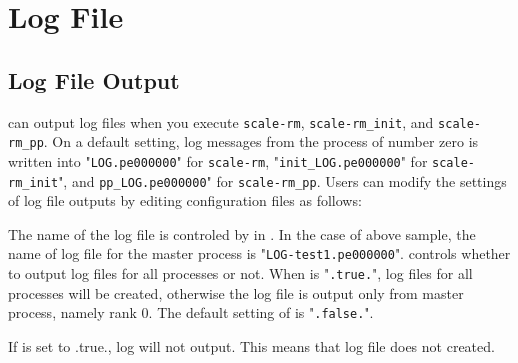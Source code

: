 \section{Log File} \label{sec:log}


\subsection{Log File Output}

\scalerm can output log files when you execute \verb|scale-rm|, \verb|scale-rm_init|, and \verb|scale-rm_pp|.
On a default setting, log messages from the process of number zero is written into "\verb|LOG.pe000000|" for \verb|scale-rm|, "\verb|init_LOG.pe000000|" for \verb|scale-rm_init|", and \verb|pp_LOG.pe000000|" for \verb|scale-rm_pp|.
Users can modify the settings of log file outputs by editing configuration files as follows:


The name of the log file is controled by  in .
In the case of above sample, the name of log file for the master process is "\verb|LOG-test1.pe000000|".
 controls whether to output log files for all processes or not.
When  is "\verb|.true.|", log files for all processes will be created, otherwise the log file is output only from master process, namely rank 0.
The default setting of  is "\verb|.false.|".

If  is set to .true., log will not output.
This means that log file does not created.

